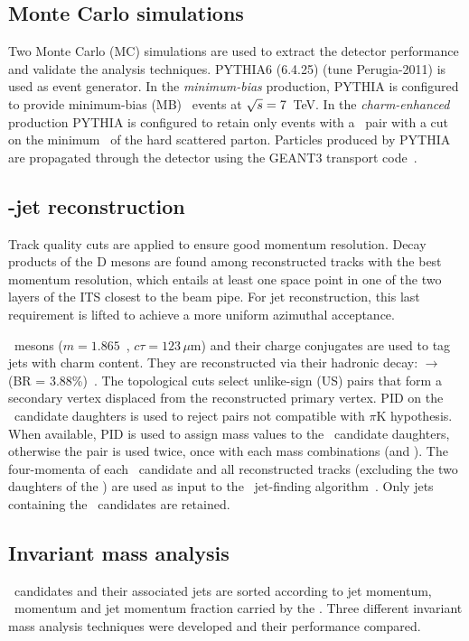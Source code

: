 \documentclass[a4paper]{jpconf}
\begin{document}
\subsection{Monte Carlo simulations}
Two Monte Carlo (MC) simulations are used to extract the detector performance and validate the analysis techniques.
PYTHIA6 (6.4.25)\cite{Sjostrand:2006} (tune Perugia-2011) is used as event generator.
In the \emph{minimum-bias} production, PYTHIA is configured to provide minimum-bias (MB) \pp\ events at $\sqrt{s}=7$~TeV.
In the \emph{charm-enhanced} production PYTHIA is configured to retain only events with a \ccbar\ pair 
with a cut on the minimum \pT\ of the hard scattered parton.
Particles produced by PYTHIA are propagated through the detector using the GEANT3 transport code~\cite{GEANT3-url}.

\subsection{\Dzero-jet reconstruction}
Track quality cuts are applied to ensure good momentum resolution. 
Decay products of the D mesons are found among reconstructed tracks with the best momentum resolution, which entails at least one space
point in one of the two layers of the ITS closest to the beam pipe.
For jet reconstruction, this last requirement is lifted to achieve a more uniform azimuthal acceptance.

\Dzero\ mesons ($m=1.865$~\GeVcsq, $c\tau=123\,\mu$m) and their charge conjugates are used to tag jets with charm content.
They are reconstructed via their hadronic decay: \Dzero $\rightarrow$ \pip \kam (BR = 3.88\%)~\cite{PDG:2014}. 
The topological cuts select unlike-sign (US) pairs that form a secondary vertex displaced from the reconstructed
primary vertex. PID on the \Dzero\ candidate daughters is used to reject pairs not compatible with $\pi$K hypothesis.
When available, PID is used to assign mass values to the \Dzero\ candidate daughters, otherwise
the pair is used twice, once with each mass combinations (\pip \kam and \pim \kap). 
The four-momenta of each \Dzero\ candidate and all reconstructed tracks
(excluding the two daughters of the \Dzero) are used as input to the \antikt\ jet-finding algorithm~\cite{Cacciari:2008c}.
Only jets containing the \Dzero\ candidates are retained.

\subsection{Invariant mass analysis}
\Dzero\ candidates and their associated jets are sorted according to jet momentum, \Dzero\ momentum and jet momentum
fraction carried by the \Dzero.
Three different invariant mass analysis techniques were developed and their performance compared.
\end{document}
